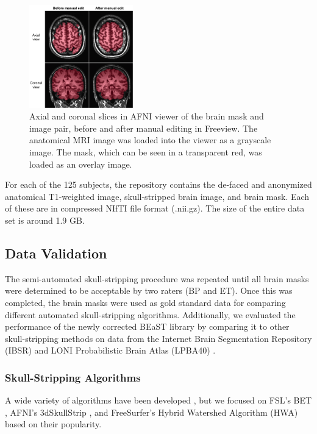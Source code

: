 \documentclass{bmcart}
\begin{document}
\begin{figure}[h!]
    \includegraphics[width=0.4\textwidth]{edit.png}
    \caption{
Axial and coronal slices in AFNI viewer of the brain mask and image pair, before and after manual editing in Freeview. The anatomical MRI image was loaded into the viewer as a grayscale image. The mask, which can be seen in a transparent red, was loaded as an overlay image.}
    \label{fig:edit}
\end{figure}

For each of the 125 subjects, the repository contains the de-faced and anonymized anatomical T1-weighted image, skull-stripped brain image, and brain mask. Each of these are in compressed NIfTI file format (.nii.gz). The size of the entire data set is around 1.9 GB.


\subsection*{Data Validation}

The semi-automated skull-stripping procedure was repeated until all brain masks were determined to be acceptable by two raters (BP and ET). Once this was completed, the brain masks were used as gold standard data for comparing different automated skull-stripping algorithms.  Additionally, we evaluated the performance of the newly corrected BEaST library by comparing it to other skull-stripping methods on data from the Internet Brain Segmentation Repository (IBSR) \cite{IBSR} and LONI Probabilistic Brain Atlas (LPBA40) \cite{lpba40}.


\subsubsection*{Skull-Stripping Algorithms}
A wide variety of algorithms have been developed \cite{Iglesias2011, MASS, Brainwash, Sadananthan2010, Lutkenhoff2014, Wang2014, pmid21195780, bse}, but we focused on FSL's BET \cite{Smith2002}, AFNI's 3dSkullStrip \cite{afni}, and FreeSurfer's Hybrid Watershed Algorithm (HWA) \cite{Segonne2004} based on their popularity.
\end{document}
